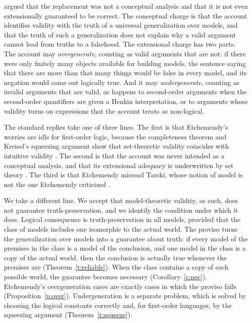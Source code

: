 \documentclass{situationist-preprint}
\begin{document}
\citet{Etchemendy1990} argued that the replacement was not a conceptual analysis and that it is not even extensionally guaranteed to be correct. The conceptual charge is that the account identifies validity with the truth of a universal generalization over models, and that the truth of such a generalization does not explain why a valid argument cannot lead from truths to a falsehood. The extensional charge has two parts. The account may \emph{overgenerate}, counting as valid arguments that are not: if there were only finitely many objects available for building models, the sentence saying that there are more than that many things would be false in every model, and its negation would come out logically true. And it may \emph{undergenerate}, counting as invalid arguments that are valid, as happens to second-order arguments when the second-order quantifiers are given a Henkin interpretation, or to arguments whose validity turns on expressions that the account treats as non-logical.

The standard replies take one of three lines. The first is that Etchemendy's worries are idle for first-order logic, because the completeness theorem and Kreisel's squeezing argument show that set-theoretic validity coincides with intuitive validity \citep{Kreisel1967}. The second is that the account was never intended as a conceptual analysis, and that its extensional adequacy is underwritten by set theory \citep{McGee1992,Shapiro1998}. The third is that Etchemendy misread Tarski, whose notion of model is not the one Etchemendy criticized \citep{Sher1996,GomezTorrente1996,Ray1996}.

We take a different line. We accept that model-theoretic validity, as such, does not guarantee truth-preservation, and we identify the condition under which it does. Logical consequence is truth-preservation in all models, provided that the class of models includes one isomorphic to the actual world. The proviso turns the generalization over models into a guarantee about truth: if every model of the premises in the class is a model of the conclusion, and one model in the class is a copy of the actual world, then the conclusion is actually true whenever the premises are (Theorem~\ref{t:reliable}). When the class contains a copy of each possible world, the guarantee becomes necessary (Corollary~\ref{c:nec}). Etchemendy's overgeneration cases are exactly cases in which the proviso fails (Proposition~\ref{p:over}). Undergeneration is a separate problem, which is solved by choosing the logical constants correctly and, for first-order languages, by the squeezing argument (Theorem~\ref{t:squeeze}).
\end{document}
